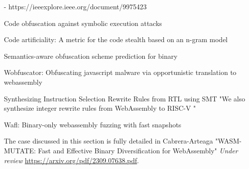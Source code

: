 - https://ieeexplore.ieee.org/document/9975423

Code obfuscation against symbolic execution attacks

Code artificiality: A metric for the code stealth based on an n-gram model

Semantics-aware obfuscation scheme prediction for binary

Wobfuscator: Obfuscating javascript malware via opportunistic translation to webassembly

Synthesizing Instruction Selection Rewrite Rules from RTL using SMT
"We also synthesize integer rewrite rules from WebAssembly to RISC-V "

Wafl: Binary-only webassembly fuzzing with fast snapshots



\begin{tcolorbox}[title=Contribution paper,boxrule=1pt,arc=.2em,boxsep=1.0mm]
    The case discussed in this section is fully detailed in Cabrera-Arteaga \etal "WASM-MUTATE: Fast and Effective Binary Diversification for WebAssembly"
    \emph{Under review}
    \url{https://arxiv.org/pdf/2309.07638.pdf}. 
\end{tcolorbox}



